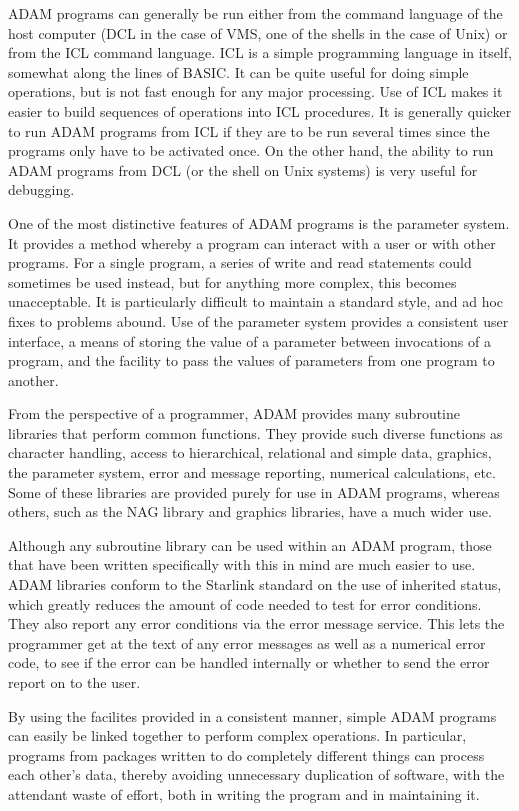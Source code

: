 \begin{description}
ADAM programs can generally be run either from the command language of the host
computer (DCL in the case of VMS, one of the shells in the case of Unix) or
from the ICL command language.
ICL is a simple programming language in itself, somewhat along the lines of
BASIC.
It can be quite useful for doing simple operations, but is not fast enough for
any major processing.
Use of ICL makes it easier to build sequences of operations into ICL procedures.
It is generally quicker to run ADAM programs from ICL if they are to be run
several times since the programs only have to be activated once.
On the other hand, the ability to run ADAM programs from DCL (or the shell on
Unix systems) is very useful for debugging.

One of the most distinctive features of ADAM programs is the parameter system.
It provides a method whereby a program can interact with a user or with other
programs.
For a single program, a series of write and read statements could sometimes be
used instead, but for anything more complex, this becomes unacceptable.
It is particularly difficult to maintain a standard style, and ad hoc fixes to
problems abound.
Use of the parameter system provides a consistent user interface, a means of
storing the value of a parameter between invocations of a program, and the
facility to pass the values of parameters from one program to another.

From the perspective of a programmer, ADAM provides many subroutine libraries
that perform common functions.
They provide such diverse functions as character handling, access to
hierarchical, relational and simple data, graphics, the parameter system, error
and message reporting, numerical calculations, etc.
Some of these libraries are provided purely for use in ADAM programs, whereas
others, such as the NAG library and graphics libraries, have a much wider use.

Although any subroutine library can be used within an ADAM program, those that
have been written specifically with this in mind are much easier to use.
ADAM libraries conform to the Starlink standard on the use of inherited status,
which greatly reduces the amount of code needed to test for error conditions.
They also report any error conditions via the error message service.
This lets the programmer get at the text of any error messages as well as a
numerical error code, to see if the error can be handled internally or whether
to send the error report on to the user.

By using the facilites provided in a consistent manner, simple ADAM programs
can easily be linked together to perform complex operations.
In particular, programs from packages written to do completely different things
can process each other's data, thereby avoiding unnecessary duplication of
software, with the attendant waste of effort, both in writing the program and
in maintaining it.


\end{description}
